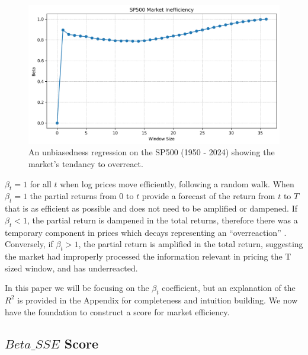 \begin{figure}[h!]
    \centering
    \includegraphics[width=1\textwidth]{../figs/SP500 Market Inefficiency.png}
    \caption{An unbiasedness regression on the SP500 (1950 - 2024) showing the market's tendancy to overreact.}
    \label{fig:sp_500_unbiasedness}
\end{figure}

$\beta_t = 1$ for all $t$ when log prices move efficiently, following a random walk. When 
$\beta_t = 1$ the partial returns from $0$ to $t$ provide a forecast of the return from $t$ to $T$ \citep{mincer_zarnowitz_1969}
 that is as efficient as possible and does not need to be amplified or dampened. 
 If $\beta_t < 1$, the partial return is dampened in the total returns, therefore there was a temporary component in prices which decays representing an “overreaction” \citep{barclay_hendershott_2003}.
Conversely, if $\beta_t > 1$, the partial return is amplified in the total return, suggesting the market had improperly processed the information relevant in pricing the T sized window, and has underreacted.

In this paper we will be focusing on the $\beta_t$ coefficient, but an explanation of the $R^2$ is provided in the Appendix for completeness and intuition building. 
We now have the foundation to construct a score for market efficiency.

\subsection{$Beta\_SSE$ Score}

